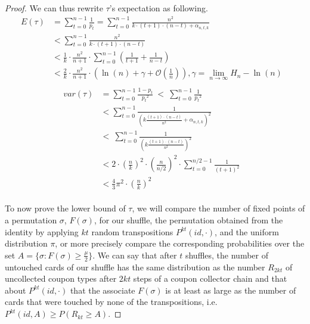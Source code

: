 \documentclass{llncs}
\begin{document}
\begin{proof}
We can thus rewrite $\tau$'s expectation as following.
\begin{align*}
 E(\tau) &= \sum_{t=0}^{n-1} \frac{1}{p_{t}} = \sum_{t=0}^{n-1} \frac{n^2}{k \cdot (t+1)\cdot(n-t) + \alpha_{n,t,k}}&\\
 &< \sum_{t=0}^{n-1} \frac{n^2}{k \cdot (t+1)\cdot(n-t)}  &\\
 &< \frac{1}{k} \cdot \frac{n^2}{n+1} \cdot  \sum_{t=0}^{n-1} \left ( \frac{1}{t+1} + \frac{1}{n-t} \right ) &\\
 &< \frac{2}{k} \cdot \frac{n^2}{n+1} \cdot \left( \ln(n) + \gamma +\mathcal{O}(\frac{1}{n}) \right), \gamma = \lim_{n \to \infty} H_n - \ln(n)& \\
 \end{align*}
 \begin{align*}
 var(\tau) &= \sum_{t=0}^{n-1}\frac{1-p_t}{{p_t}^2}\ <\  \sum_{t=0}^{n-1}\frac{1}{{p_t}^2} &\\
 &< \sum_{t=0}^{n-1}\frac{1}{\left ( k \frac{(t+1)\cdot(n-t)}{n^2} + \alpha_{n,t,k}\right )^2}\\\
 &<\ \sum_{t=0}^{n-1} \frac{1 }{\left ( k \frac{(t+1)\cdot(n-t)}{n^2} \right )^2} &\\
 &< 2 \cdot \left (\frac{n}{k} \right )^2 \cdot \left (\frac{n}{n/2} \right )^2 \cdot \sum_{t=0}^{n/2-1} \frac{1}{(t+1)^2} &\\
 &< \frac{4}{3} \pi^2 \cdot \left (\frac{n}{k} \right )^2 
\end{align*}
\\

To now prove the lower bound of $\tau$, we will compare the number of fixed points of a permutation $\sigma$, $F(\sigma)$, for our shuffle, the permutation
obtained from the identity by applying $kt$ random transpositions $ P^{kt}(id, \cdot)$, and the uniform distribution $\pi$, or more precisely compare the corresponding probabilities over the set $A=\{\sigma : F(\sigma) \geq \frac{\mu}{2} \}$.
We can say that after $t$ shuffles, the number of untouched cards of our shuffle has the same distribution as the number $R_{2kt}$ of uncollected coupon types after $2kt$ steps of a coupon collector chain
and that about $ P^{kt}(id, \cdot)$ that the associate $F(\sigma)$ is at least as large as the number of cards that were touched by none of the transpositions, i.e. $P^{kt}(id,A) \geq P(R_{kt}\geq A) $.


\end{proof}
\end{document}
